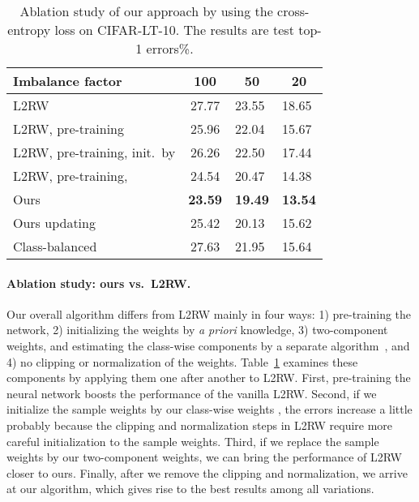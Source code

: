 \begin{table}
\centering
\caption {\label{tab:Ablation_CIFAR-10} Ablation study of our approach by using the cross-entropy loss on CIFAR-LT-10. The results are test top-1 errors\%.}
\vspace{2pt}
\resizebox{0.45\textwidth}{!}
{\begin{tabular}{l|c|l|l}
\hline


Imbalance factor & 100 & \multicolumn{1}{c|}{50} & \multicolumn{1}{c}{20} \\ \hline











L2RW~\cite{L2RW} & 27.77  & 23.55  & 18.65 \\ \hline
 
L2RW, pre-training & 25.96  & 22.04  & 15.67 \\ \hline

L2RW, pre-training, init.\ by  & 26.26  & 22.50  & 17.44 \\ \hline

L2RW, pre-training,  & 24.54  & 20.47  & 14.38 \\ \hline

Ours  & \multicolumn{1}{l|}{\bf 23.59} & {\bf 19.49} & {\bf 13.54} \\ \hline

\hline

\hline

Ours updating  & 25.42  & 20.13 & 15.62  \\ \hline

Class-balanced~\cite{CBLoss} & 27.63  & 21.95 & 15.64 \\ \hline
\end{tabular}
}\vspace{-15pt}
\end{table}



\vspace{-10pt}
\paragraph{Ablation study: ours vs.\ L2RW.}
Our overall algorithm differs from L2RW mainly in four ways: 1) pre-training the network, 2) initializing the weights by \textit{a priori} knowledge, 3) two-component weights, and estimating the class-wise components by a separate algorithm~\cite{CBLoss}, and 4) no clipping or normalization of the weights. Table~\ref{tab:Ablation_CIFAR-10} examines these components by applying them one after another to L2RW. First, pre-training the neural network boosts the performance of the vanilla L2RW. Second, if we initialize the sample weights by our class-wise weights , the errors increase a little probably because the clipping and normalization steps in L2RW require more careful initialization to the sample weights. Third, if we replace the sample weights by our two-component weights, we can bring the performance of L2RW closer to ours. Finally, after we remove the clipping and normalization, we arrive at our algorithm, which gives rise to the best results among all variations. 

